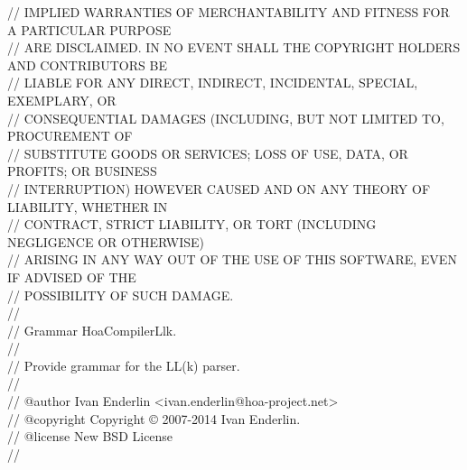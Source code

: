 \begin{bigbigpre}
// IMPLIED WARRANTIES OF MERCHANTABILITY AND FITNESS FOR A PARTICULAR PURPOSE \\
// ARE DISCLAIMED. IN NO EVENT SHALL THE COPYRIGHT HOLDERS AND CONTRIBUTORS BE \\
// LIABLE FOR ANY DIRECT, INDIRECT, INCIDENTAL, SPECIAL, EXEMPLARY, OR \\
// CONSEQUENTIAL DAMAGES (INCLUDING, BUT NOT LIMITED TO, PROCUREMENT OF \\
// SUBSTITUTE GOODS OR SERVICES; LOSS OF USE, DATA, OR PROFITS; OR BUSINESS \\
// INTERRUPTION) HOWEVER CAUSED AND ON ANY THEORY OF LIABILITY, WHETHER IN \\
// CONTRACT, STRICT LIABILITY, OR TORT (INCLUDING NEGLIGENCE OR OTHERWISE) \\
// ARISING IN ANY WAY OUT OF THE USE OF THIS SOFTWARE, EVEN IF ADVISED OF THE \\
// POSSIBILITY OF SUCH DAMAGE. \\
// \\
// Grammar \bslash{}Hoa\bslash{}Compiler\bslash{}Llk. \\
// \\
// Provide grammar for the LL(k) parser. \\
// \\
// @author     Ivan Enderlin <ivan.enderlin@hoa-project.net> \\
// @copyright  Copyright © 2007-2014 Ivan Enderlin. \\
// @license    New BSD License \\
// \\
 \\
 \\
 \\
 \\

\end{bigbigpre}
